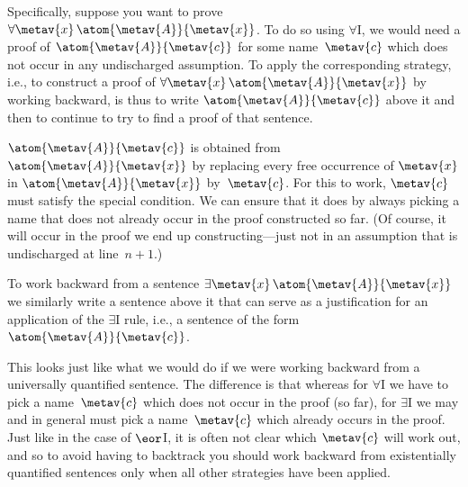 Specifically, suppose you want to prove $\forall \metav{x}\, \atom{\metav{A}}{\metav{x}}$. To do so using $\forall$I, we would need a proof of $\atom{\metav{A}}{\metav{c}}$ for some name~$\metav{c}$ which does not occur in any undischarged assumption. To apply the corresponding strategy, i.e., to construct a proof of $\forall \metav{x}\, \atom{\metav{A}}{\metav{x}}$ by working backward, is thus to write $\atom{\metav{A}}{\metav{c}}$ above it and then to continue to try to find a proof of that sentence.
\begin{fitchproof}
	\ellipsesline
\end{fitchproof}
$\atom{\metav{A}}{\metav{c}}$ is obtained from $\atom{\metav{A}}{\metav{x}}$ by replacing every free occurrence of $\metav{x}$ in $\atom{\metav{A}}{\metav{x}}$ by~$\metav{c}$. For this to work, $\metav{c}$ must satisfy the special condition. We can ensure that it does by always picking a name that does not already occur in the proof constructed so far. (Of course, it will occur in the proof we end up constructing---just not in an assumption that is undischarged at line~$n+1$.)

To work backward from a sentence $\exists \metav{x}\, \atom{\metav{A}}{\metav{x}}$ we similarly write a sentence above it that can serve as a justification for an application of the $\exists$I rule, i.e., a sentence of the form $\atom{\metav{A}}{\metav{c}}$.
\begin{fitchproof}
	\ellipsesline
\end{fitchproof}
This looks just like what we would do if we were working backward from a universally quantified sentence. The difference is that whereas for $\forall$I we have to pick a name~$\metav{c}$ which does not occur in the proof (so far), for $\exists$I we may and in general must pick a name~$\metav{c}$ which already occurs in the proof.  Just like in the case of $\eor$I, it is often not clear which $\metav{c}$ will work out, and so to avoid having to backtrack you should work backward from existentially quantified sentences only when all other strategies have been applied.

